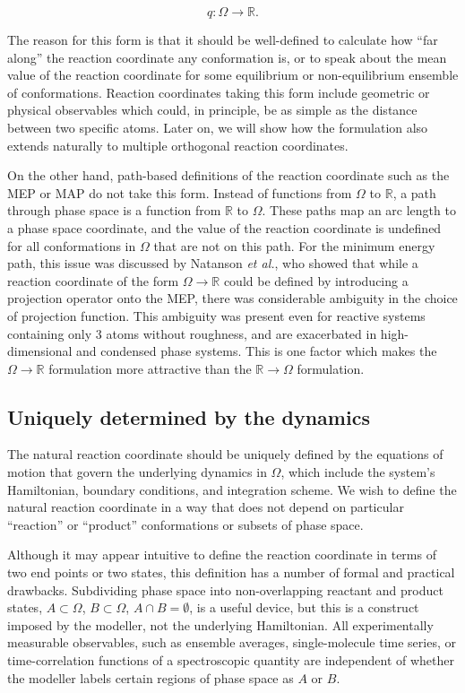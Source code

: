 \documentclass[aip, jcp, reprint, nolinenumbers, twocolumn, nobalancelastpage, nofootinbib]{revtex4-1}
\begin{document}
$$
q : \Omega \rightarrow \mathbb{R}.
$$

The reason for this form is that it should be well-defined to calculate how ``far along'' the reaction coordinate any conformation is, or to speak about the mean value of the reaction coordinate for some equilibrium or non-equilibrium ensemble of conformations. Reaction coordinates taking this form include geometric or physical observables which could, in principle, be as simple as the distance between two specific atoms. Later on, we will show how the formulation also extends naturally to multiple orthogonal reaction coordinates.

On the other hand, path-based definitions of the reaction coordinate such as the MEP or MAP do not take this form. Instead of functions from $\Omega$ to $\mathbb{R}$, a path through phase space is a function from $\mathbb{R}$ to $\Omega$. These paths map an arc length to a phase space coordinate, and the value of the reaction coordinate is undefined for all conformations in $\Omega$ that are not on this path. For the minimum energy path, this issue was discussed by Natanson \emph{et al.}, \cite{natanson1991definition} who showed that while a reaction coordinate of the form $\Omega \rightarrow \mathbb{R}$ could be defined by introducing a projection operator onto the MEP, there was considerable ambiguity in the choice of projection function. This ambiguity was present even for reactive systems containing only 3 atoms without roughness, and are exacerbated in high-dimensional and condensed phase systems. This is one factor which makes the $\Omega \rightarrow \mathbb{R}$ formulation more attractive than the $\mathbb{R} \rightarrow \Omega$ formulation.

\subsection{Uniquely determined by the dynamics}
\label{sect:uniquely_dertmined}

The natural reaction coordinate should be uniquely defined by the equations of motion that govern the underlying dynamics in $\Omega$, which include the system's Hamiltonian, boundary conditions, and integration scheme. We wish to define the natural reaction coordinate in a way that does not depend on particular ``reaction'' or ``product'' conformations or subsets of phase space.

Although it may appear intuitive to define the reaction coordinate in terms of two end points or two states, this definition has a number of formal and practical drawbacks. Subdividing phase space into non-overlapping reactant and product states, $A \subset \Omega$, $B \subset \Omega$, $A \cap B = \emptyset$, is a useful device, but this is a construct imposed by the modeller, not the underlying Hamiltonian. All experimentally measurable observables, such as ensemble averages, single-molecule time series, or time-correlation functions of a spectroscopic quantity are independent of whether the modeller labels certain regions of phase space as $A$ or $B$.
\end{document}
